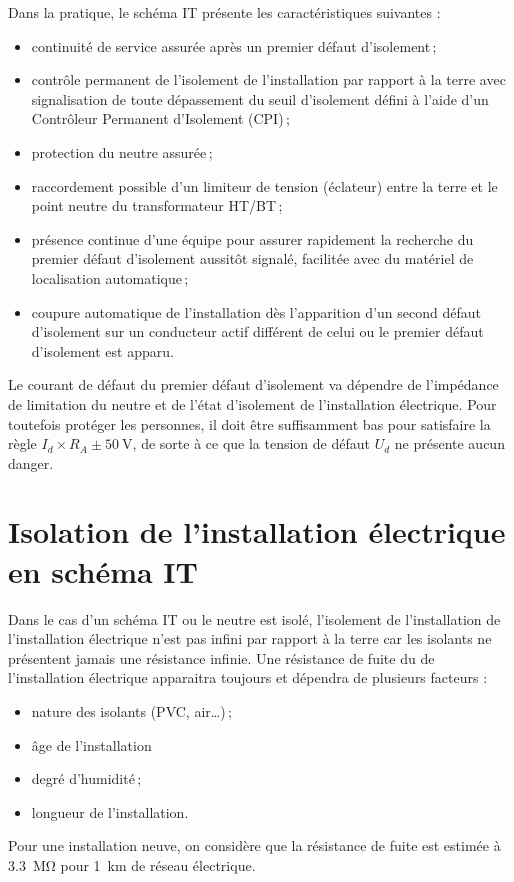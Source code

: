 Dans la pratique, le schéma IT présente les caractéristiques suivantes :
\begin{itemize}
\item continuité de service assurée après un premier défaut d'isolement\,;
\item contrôle permanent de l'isolement de l'installation par rapport à la terre avec signalisation de toute dépassement du seuil d'isolement défini à l'aide d'un Contrôleur Permanent d'Isolement (CPI)\,;
\item protection du neutre assurée\,;
\item raccordement possible d'un limiteur de tension (éclateur) entre la terre et le point neutre du transformateur HT/BT\,;
\item présence continue d'une équipe pour assurer rapidement la recherche du premier défaut d'isolement aussitôt signalé, facilitée avec du matériel de localisation automatique\,;
\item coupure automatique de l'installation dès l'apparition d'un second défaut d'isolement sur un conducteur actif différent de celui ou le premier défaut d'isolement est apparu.
\end{itemize}

Le courant de défaut du premier défaut d'isolement va dépendre de l'impédance de limitation du neutre et de l'état d'isolement de l'installation électrique. Pour toutefois protéger les personnes, il doit être suffisamment bas pour satisfaire la règle $I_{d} \times R_{A} \pm \SI{50}{\volt}$, de sorte à ce que la tension de défaut $U_d$ ne présente aucun danger.

\section{Isolation de l'installation électrique en schéma IT\label{sec:isolation_installation_schema_it}}

Dans le cas d'un schéma IT ou le neutre est isolé, l'isolement de l'installation de l'installation électrique n'est pas infini par rapport à la terre car les isolants ne présentent jamais une résistance infinie. Une résistance de fuite du de l'installation électrique apparaitra toujours et dépendra de plusieurs facteurs :
\begin{itemize}
\item nature des isolants (PVC, air\ldots)\,;
\item âge de l'installation
\item degré d'humidité\,;
\item longueur de l'installation.
\end{itemize}
Pour une installation neuve, on considère que la résistance de fuite est estimée à \SI{3,3}{\mega\ohm} pour \SI{1}{\kilo\meter} de réseau électrique.

